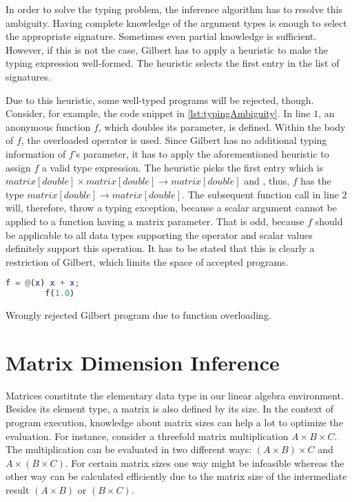 In order to solve the typing problem, the inference algorithm has to resolve this ambiguity.
Having complete knowledge of the argument types is enough to select the appropriate signature.
Sometimes even partial knowledge is sufficient.
However, if this is not the case, Gilbert has to apply a heuristic to make the typing expression well-formed.
The heuristic selects the first entry in the list of signatures.

Due to this heuristic, some well-typed programs will be rejected, though.
Consider, for example, the code snippet in \cref{lst:typingAmbiguity}.
In line $1$, an anonymous function $f$, which doubles its parameter, is defined.
Within the body of $f$, the overloaded \code{+} operator is used.
Since Gilbert has no additional typing information of $f$'s parameter, it has to apply the aforementioned heuristic to assign $f$ a valid type expression.
The heuristic picks the first entry which is $matrix[double] \times matrix[double] \rightarrow matrix[double]$ and , thus, $f$ has the type $matrix[double] \rightarrow matrix[double]$.
The subsequent function call  in line $2$ will, therefore, throw a typing exception, because a scalar argument cannot be applied to a function having a matrix parameter.
That is odd, because $f$ should be applicable to all data types supporting the \code{+} operator and scalar values definitely support this operation.
It has to be stated that this is clearly a restriction of Gilbert, which limits the space of accepted programs.

\begin{listing}[!h]
	\begin{CenteredBox}
		\begin{lstlisting}[language=Matlab]
		f = @(x) x + x;
		f(1.0)
		\end{lstlisting}
	\end{CenteredBox}
	\caption{Wrongly rejected Gilbert program due to function overloading.}
	\label{lst:typingAmbiguity}
\end{listing}

\section{Matrix Dimension Inference}
\label{sec:MatrixDimensionInference}

Matrices constitute the elementary data type in our linear algebra environment.
Besides its element type, a matrix is also defined by its size.
In the context of program execution, knowledge about matrix sizes can help a lot to optimize the evaluation.
For instance, consider a threefold matrix multiplication $A\times B\times C$.
The multiplication can be evaluated in two different ways: $(A\times B)\times C$ and $A\times(B\times C)$.
For certain matrix sizes one way might be infeasible whereas the other way can be calculated efficiently due to the matrix size of the intermediate result $(A\times B)$ or $(B\times C)$.

